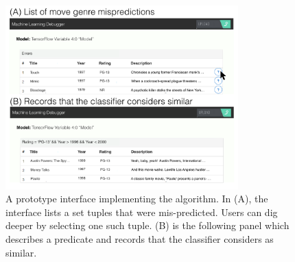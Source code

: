 \begin{figure}[t]
    \centering
    \includegraphics[width=0.8\textwidth]{figures/interface.png}
    \caption{A prototype interface implementing the algorithm. In (A), the interface lists a set tuples that were mis-predicted. Users can dig deeper by selecting one such tuple. (B) is the following panel which describes a predicate and records that the classifier considers as similar.}
    \label{fig:interface}
\end{figure}